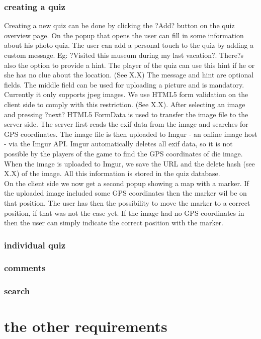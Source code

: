 \documentclass[11pt, oneside]{article}   	%
\begin{document}
\subsubsection{creating a quiz}
Creating a new quiz can be done by clicking the ?Add? button on the quiz overview page. On the popup that opens the user can fill in some information about his photo quiz. The user can add a personal touch to the quiz by adding a custom message. Eg: ?Visited this museum during my last vacation?. There?s also the option to provide a hint. The player of the quiz can use this hint if he or she has no clue about the location. (See X.X) The message and hint are optional fields. The middle field can be used for uploading a picture and is mandatory. Currently it only supports jpeg images. We use HTML5 form validation on the client side to comply with this restriction. (See X.X).
After selecting an image and pressing ?next? HTML5 FormData is used to transfer the image file to the server side. The server first reads the exif data from the image and searches for GPS coordinates. The image file is then uploaded to Imgur - an online image host - via the Imgur API. Imgur automatically deletes all exif data, so it is not possible by the players of the game to find the GPS coordinates of die image. When the image is uploaded to Imgur, we save the URL and the delete hash (see X.X) of the image. All this information is stored in the quiz database. \\
On the client side we now get a second popup showing a map with a marker. If the uploaded image included some GPS coordinates then the marker wil be on that position. The user has then the possibility to move the marker to a correct position, if that was not the case yet. If the image had no GPS coordinates in then the user can simply indicate the correct position with the marker. 

\subsubsection{ individual quiz}
\subsubsection{comments}
\subsubsection{search}


\section{the other requirements} %
\end{document}

